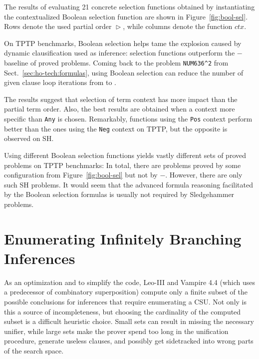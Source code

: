 The results of evaluating 21 concrete selection functions obtained
by instantiating the contextualized Boolean selection function are shown in
Figure~\ref{fig:bool-sel}. Rows denote the used partial order $\vartriangleright$,
while columns denote the function $\mathit{ctx}$.

On TPTP benchmarks, Boolean selection helps tame the explosion caused by
dynamic clausification used as inference:  selection functions
outperform the $-$ baseline of  proved problems. Coming back to the problem
\texttt{NUM636\^{}2} from Sect.~\ref{sec:ho-tech:formulas}, using Boolean selection
can reduce the number of given clause loop iterations from
 to .

The results suggest that selection of term context has more impact
than the partial term order. %
Also, the best results are obtained when a context more specific than \texttt{Any}
is chosen. Remarkably, functions using the \texttt{Pos} context
perform better than the ones using the \texttt{Neg} context
on TPTP, but the opposite is observed on SH.


Using different Boolean selection functions yields vastly different sets of
proved problems on TPTP benchmarks: In total, there are  problems
proved by some configuration from Figure~\ref{fig:bool-sel} but not by
$-$. However, there are only  such SH problems.
It would seem that the advanced formula reasoning facilitated by the Boolean
selection formulas is usually not required by Sledgehammer problems.


\section{Enumerating Infinitely Branching Inferences}
\label{sec:ho-tech:infinite-branching}

As an optimization and to simplify the code, Leo-III
\cite{as-18-phd} and Vampire 4.4 \cite{br-19-restricted-unif} (which uses
a predecessor of combinatory
superposition) compute only a finite subset of the possible conclusions for
inferences that require enumerating a CSU. Not only is this a source of
incompleteness, but choosing the cardinality of the computed subset is a
difficult heuristic choice. Small sets can result in missing the necessary unifier, while large sets make the prover spend too long in
the unification procedure, generate useless clauses, and possibly get sidetracked into wrong parts of the search space.

